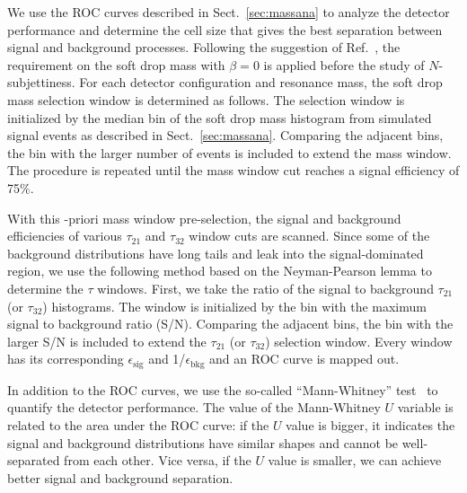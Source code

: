 We use the ROC curves described in Sect.~\ref{sec:massana} to 
analyze the detector performance and determine the cell size that gives the 
best separation between signal and background processes. 
Following the suggestion of Ref.~\cite{Dreyer:2018tjj}, the requirement on the 
soft drop mass with $\beta=0$ is applied before the study of $N$-subjettiness. 
For each detector configuration and resonance mass, the soft drop mass selection window  
is determined as follows. The selection window is initialized by the median bin of the soft drop 
mass histogram from simulated signal events as described in 
Sect.~\ref{sec:massana}. Comparing the adjacent bins, the bin with the larger number of events is included to extend the mass window. The procedure is 
repeated until the mass window cut reaches a signal  efficiency of 75\%. 

With this {\a-priori} mass window pre-selection, the signal and background efficiencies of 
various $\tau_{21}$ and $\tau_{32}$ window cuts are scanned. 
Since some of the background distributions have long tails and leak into the 
signal-dominated region, we use the following method based on the 
Neyman-Pearson lemma to determine the $\tau$ windows. 
First, we take the ratio of the signal to background $\tau_{21}$ (or $\tau_{32}$) 
histograms. The window is initialized by the bin with the maximum signal to 
background ratio (S/N).  
Comparing the adjacent bins,  the bin with the larger S/N is included  to extend the $\tau_{21}$ (or $\tau_{32}$) 
selection window.  Every window has its corresponding $\epsilon_\mathrm{sig}$ and 
1/$\epsilon_\mathrm{bkg}$ and an ROC curve is mapped out. 

In addition to the ROC curves, we use the so-called ``Mann-Whitney'' test~\cite{mann1947} to 
quantify the detector performance. 
The value of the Mann-Whitney $U$ variable is related to the area under the ROC 
curve: if the $U$ value is bigger, it indicates the signal and background
 distributions have similar shapes and cannot be well-separated from 
each other. Vice versa, if the $U$ value is smaller, we can achieve better 
signal and background separation. 

